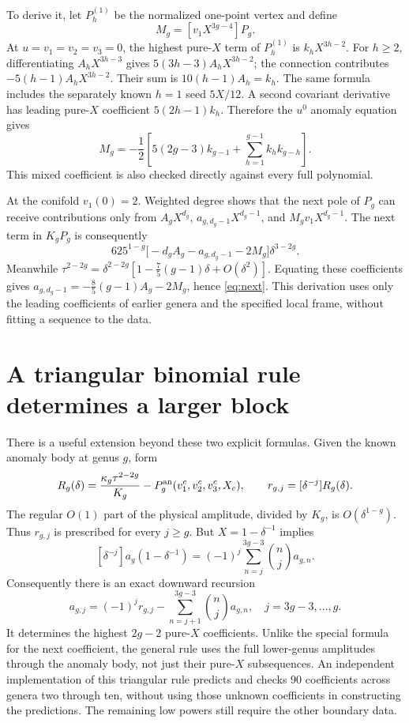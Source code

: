 \documentclass[11pt]{article}
\begin{document}
To derive it, let $P_h^{(1)}$ be the normalized one-point vertex and define
\[
 M_g=[v_1X^{3g-4}]P_g.
\]
At $u=v_1=v_2=v_3=0$, the highest pure-$X$ term of $P_h^{(1)}$ is
$k_hX^{3h-2}$. For $h\ge2$, differentiating $A_hX^{3h-3}$ gives
$5(3h-3)A_hX^{3h-2}$; the connection contributes
$-5(h-1)A_hX^{3h-2}$. Their sum is $10(h-1)A_h=k_h$.
The same formula includes the separately known $h=1$ seed $5X/12$.
A second covariant derivative has leading pure-$X$ coefficient
$5(2h-1)k_h$. Therefore the $u^0$ anomaly equation gives
\begin{equation}
 M_g=-\frac12\left[5(2g-3)k_{g-1}
                       +\sum_{h=1}^{g-1}k_hk_{g-h}\right].
\end{equation}
This mixed coefficient is also checked directly against every full polynomial.

At the conifold $v_1(0)=2$. Weighted degree shows that the next pole of $P_g$
can receive contributions only from $A_gX^{d_g}$,
$a_{g,d_g-1}X^{d_g-1}$, and $M_gv_1X^{d_g-1}$.
The next term in $K_gP_g$ is consequently
\[
 625^{1-g}\bigl[-d_gA_g-a_{g,d_g-1}-2M_g\bigr]\delta^{3-2g}.
\]
Meanwhile $\tau^{2-2g}=\delta^{2-2g}
[1-\frac75(g-1)\delta+O(\delta^2)]$.
Equating these coefficients gives
$a_{g,d_g-1}=-\frac85(g-1)A_g-2M_g$, hence \eqref{eq:next}.
This derivation uses only the leading coefficients of earlier genera and the
specified local frame, without fitting a sequence to the data.

\section{A triangular binomial rule determines a larger block}
There is a useful extension beyond these two explicit formulas. Given the
known anomaly body at genus $g$, form
\[
 R_g(\delta)=\frac{\kappa_g\tau^{2-2g}}{K_g}
             -P_g^{\rm an}(v_1^c,v_2^c,v_3^c,X_c),\qquad
 r_{g,j}=[\delta^{-j}]R_g(\delta).
\]
The regular $O(1)$ part of the physical amplitude, divided by $K_g$, is
$O(\delta^{1-g})$. Thus $r_{g,j}$ is prescribed for every $j\ge g$.
But $X=1-\delta^{-1}$ implies
\[
 [\delta^{-j}]a_g(1-\delta^{-1})
 =(-1)^j\sum_{n=j}^{3g-3}\binom nj a_{g,n}.
\]
Consequently there is an exact downward recursion
\begin{equation}\boxed{
 a_{g,j}=(-1)^j r_{g,j}
       -\sum_{n=j+1}^{3g-3}\binom nj a_{g,n},
 \quad j=3g-3,\ldots,g.}
\end{equation}
It determines the highest $2g-2$ pure-$X$ coefficients. Unlike the special
formula for the next coefficient, the general rule uses the full lower-genus
amplitudes through the anomaly body, not just their pure-$X$ subsequences.
An independent implementation of this triangular rule predicts and checks
90 coefficients across genera two through ten, without using those unknown
coefficients in constructing the predictions.
The remaining low powers still require the other boundary data.
\end{document}
